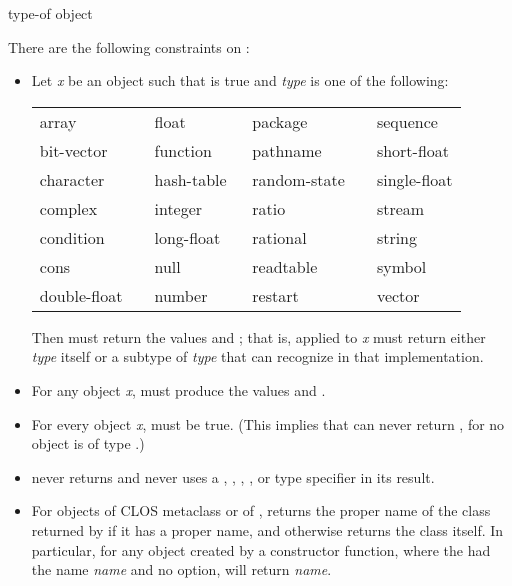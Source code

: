 \begin{defun}[Function]
type-of object

There are the following constraints on :

\begin{itemize}
\item
Let \emph{x} be an object such that 
is true and \emph{type} is one of the following:

\begin{flushleft}
\cf
\begin{tabular}{@{}llll@{}}
array          & float        & package        & sequence \\
bit-vector     & function     & pathname       & short-float \\
character      & hash-table   & random-state~~ & single-float \\
complex        & integer      & ratio          & stream \\
condition      & long-float~~ & rational       & string \\
cons           & null         & readtable      & symbol \\
double-float~~ & number       & restart        & vector
\end{tabular}
\end{flushleft}

Then
must return the values  and ; that is,  applied
to \emph{x} must return either \emph{type} itself or a subtype of \emph{type}
that  can recognize in that implementation.

\item
For any object \emph{x}, 
must produce the values  and .

\item
For every object \emph{x}, 
must be true.  (This implies that  can never return ,
for no object is of type .)

\item
{} never returns  and never uses
a , , , ,
or  type specifier in its result.

\item
For objects of CLOS metaclass  or of ,
 returns the proper name of the class returned by 
if it has a proper name, and otherwise returns the class itself.
In particular,
for any object created by a  constructor function,
where the  had the name \emph{name} and no  option,
 will return \emph{name}.
\end{itemize}


\end{defun}
